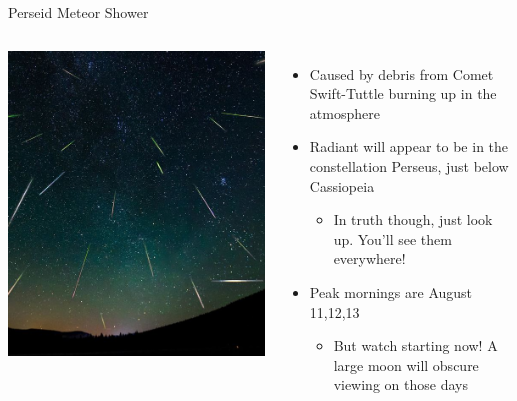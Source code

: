 \documentclass[pdf, ]{beamer}
\begin{document}
\begin{frame}{Perseid Meteor Shower}
	\begin{columns}
		\begin{center}
			\vspace{-5mm}
			\includegraphics[width=1.1\textwidth]{Perseids.png}
		\end{center}
		
		\begin{itemize}
			\item Caused by debris from Comet Swift-Tuttle burning up in the atmosphere
			\item \alert{Radiant} will appear to be in the constellation Perseus, just below Cassiopeia
				\begin{itemize}
					\item In truth though, just look up. You'll see them everywhere!
				\end{itemize}
				
			\item Peak mornings are August 11,12,13
				\begin{itemize}
					\item But watch starting now! A large moon will obscure viewing on those days
				\end{itemize}
		\end{itemize}
	\end{columns}
\end{frame}
\end{document}
